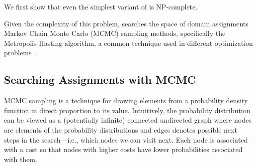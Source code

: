 We first show that even the simplest variant of  is NP-complete.
\begin{theorem}
\end{theorem}
Given the complexity of this problem, \name  searches the space of domain
assignments Markov
Chain Monte Carlo (MCMC) sampling methods, specifically the Metropolis-Hasting
algorithm, a common technique used in different optimization 
problems~\cite{stoke}. 

\subsection{Searching Assignments with MCMC}
MCMC sampling is a technique for 
drawing elements from a
probability density function in direct proportion to its value.
Intuitively, the probability distribution can be viewed as a (potentially infinite) 
connected undirected graph
where nodes are elements of the probability distributions
and edges denotes possible next steps in the search---i.e.,
which nodes we can visit next.
Each node is associated with a cost so that nodes with higher costs have lower
probabilities associated with them.

